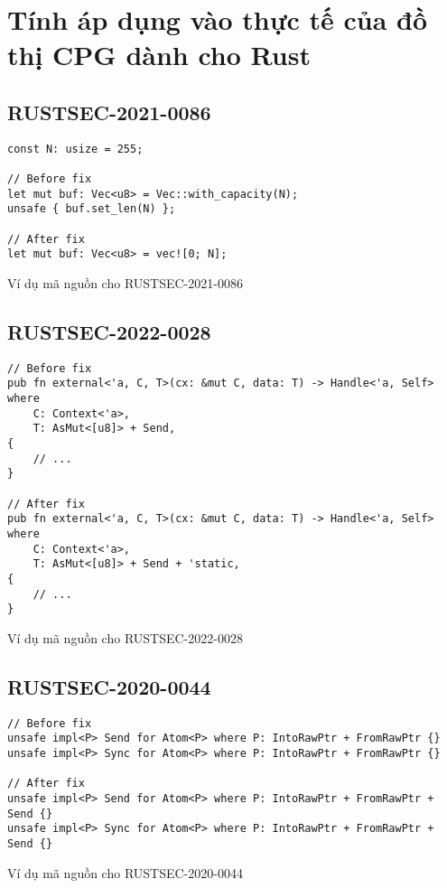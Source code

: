 \section{Tính áp dụng vào thực tế của đồ thị CPG dành cho Rust}

\subsection{RUSTSEC-2021-0086}

\begin{listing}[H]
\begin{verbatim}
const N: usize = 255;

// Before fix
let mut buf: Vec<u8> = Vec::with_capacity(N);
unsafe { buf.set_len(N) };

// After fix
let mut buf: Vec<u8> = vec![0; N];
\end{verbatim}
\caption{Ví dụ mã nguồn cho RUSTSEC-2021-0086}
\label{code:c4_RUSTSEC-2021-0086}
\end{listing}

\subsection{RUSTSEC-2022-0028}

\begin{listing}[H]
\begin{verbatim}
// Before fix
pub fn external<'a, C, T>(cx: &mut C, data: T) -> Handle<'a, Self>
where
    C: Context<'a>,
    T: AsMut<[u8]> + Send,
{
    // ...
}

// After fix
pub fn external<'a, C, T>(cx: &mut C, data: T) -> Handle<'a, Self>
where
    C: Context<'a>,
    T: AsMut<[u8]> + Send + 'static,
{
    // ...
}
\end{verbatim}
\caption{Ví dụ mã nguồn cho RUSTSEC-2022-0028}
\label{code:c4_RUSTSEC-2022-0028}
\end{listing}

\subsection{RUSTSEC-2020-0044}

\begin{listing}[H]
\begin{verbatim}
// Before fix
unsafe impl<P> Send for Atom<P> where P: IntoRawPtr + FromRawPtr {}
unsafe impl<P> Sync for Atom<P> where P: IntoRawPtr + FromRawPtr {}

// After fix
unsafe impl<P> Send for Atom<P> where P: IntoRawPtr + FromRawPtr + Send {}
unsafe impl<P> Sync for Atom<P> where P: IntoRawPtr + FromRawPtr + Send {}
\end{verbatim}
\caption{Ví dụ mã nguồn cho RUSTSEC-2020-0044}
\label{code:c4_RUSTSEC-2020-0044}
\end{listing}

